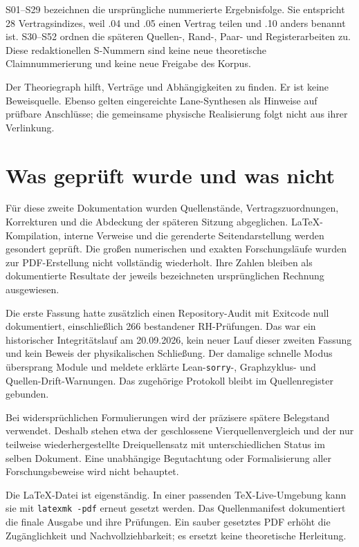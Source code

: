 \documentclass[11pt,a4paper,oneside,parskip=half,headings=normal,numbers=noenddot,bibliography=totoc]{scrreprt}
\begin{document}
S01--S29 bezeichnen die ursprüngliche nummerierte Ergebnisfolge. Sie entspricht 28 Vertragsindizes, weil .04 und .05 einen Vertrag teilen und .10 anders benannt ist. S30--S52 ordnen die späteren Quellen-, Rand-, Paar- und Registerarbeiten zu. Diese redaktionellen S-Nummern sind keine neue theoretische Claimnummerierung und keine neue Freigabe des Korpus.

Der Theoriegraph hilft, Verträge und Abhängigkeiten zu finden. Er ist keine Beweisquelle. Ebenso gelten eingereichte Lane-Synthesen als Hinweise auf prüfbare Anschlüsse; die gemeinsame physische Realisierung folgt nicht aus ihrer Verlinkung.

\section{Was geprüft wurde und was nicht}
Für diese zweite Dokumentation wurden Quellenstände, Vertragszuordnungen, Korrekturen und die Abdeckung der späteren Sitzung abgeglichen. LaTeX-Kompilation, interne Verweise und die gerenderte Seitendarstellung werden gesondert geprüft. Die großen numerischen und exakten Forschungsläufe wurden zur PDF-Erstellung nicht vollständig wiederholt. Ihre Zahlen bleiben als dokumentierte Resultate der jeweils bezeichneten ursprünglichen Rechnung ausgewiesen.

Die erste Fassung hatte zusätzlich einen Repository-Audit mit Exitcode null dokumentiert, einschließlich 266 bestandener RH-Prüfungen. Das war ein historischer Integritätslauf am 20.09.2026, kein neuer Lauf dieser zweiten Fassung und kein Beweis der physikalischen Schließung. Der damalige schnelle Modus übersprang Module und meldete erklärte Lean-\texttt{sorry}-, Graphzyklus- und Quellen-Drift-Warnungen. Das zugehörige Protokoll bleibt im Quellenregister gebunden.

Bei widersprüchlichen Formulierungen wird der präzisere spätere Belegstand verwendet. Deshalb stehen etwa der geschlossene Vierquellenvergleich und der nur teilweise wiederhergestellte Dreiquellensatz mit unterschiedlichen Status im selben Dokument. Eine unabhängige Begutachtung oder Formalisierung aller Forschungsbeweise wird nicht behauptet.

Die LaTeX-Datei ist eigenständig. In einer passenden TeX-Live-Umgebung kann sie mit \texttt{latexmk -pdf} erneut gesetzt werden. Das Quellenmanifest dokumentiert die finale Ausgabe und ihre Prüfungen. Ein sauber gesetztes PDF erhöht die Zugänglichkeit und Nachvollziehbarkeit; es ersetzt keine theoretische Herleitung.
\end{document}
